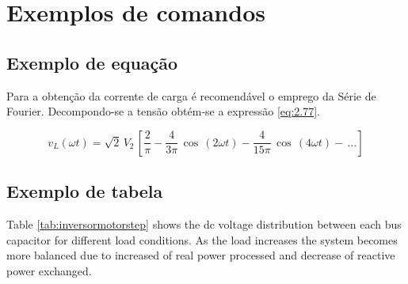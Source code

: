 \section{Exemplos de comandos}


\subsection{Exemplo de equação}


Para a obtenção da corrente de carga é recomendável o emprego da Série de Fourier. Decompondo-se a tensão obtém-se a expressão \eqref{eq:2.77}.

\begin{equation}\label{eq:2.77}
{v_L}(\omega t) = \sqrt 2 \,{V_2}\,\left[ {\frac{2}{\pi } - \frac{4}{{3\pi }}\,\cos \,(2\omega t) - \frac{4}{{15\pi }}\,\cos \,(4\omega t) - \, \ldots } \right]
\end{equation}

\subsection{Exemplo de tabela}


Table \ref{tab:inversormotorstep} shows the dc voltage distribution between each bus capacitor for different load conditions. As the load increases the system becomes more balanced  due to increased of real power processed and decrease of reactive power exchanged.


